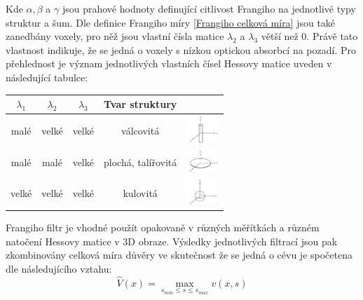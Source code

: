 \documentclass{thesis}%
\begin{document}
Kde $\alpha,\beta$ a $\gamma$ jsou prahové hodnoty definující citlivost Frangiho na jednotlivé typy struktur a šum. Dle definice Frangiho míry  \ref{Frangiho celková míra} jsou také zanedbány voxely, pro něž jsou vlastní čísla matice $\lambda_2$ a $\lambda_3$ větší než 0. Právě tato vlastnost indikuje, že se jedná o voxely s nízkou optickou absorbcí na pozadí. Pro přehlednost je význam jednotlivých vlastních čísel Hessovy matice uveden v následující tabulce:
\begin{center} 
\begin{tabular}{c c c c c}
\hline
$\lambda_1$ & $\lambda_2$  & $\lambda_3$ & Tvar struktury& \\
\hline
malé & velké  & velké & válcovitá &\includegraphics[width=1.2cm]{imgs/tube.png} \\
\hline
malé & malé  & velké & plochá, talířovitá &\includegraphics[width=1.2cm]{imgs/plate.png} \\
\hline
velké & velké  & velké & kulovitá &\includegraphics[width=1.2cm]{imgs/blob.png} \\
\end{tabular}
\end{center}
Frangiho filtr je vhodné použít opakovaně v různých měřítkách a různém natočení Hessovy matice v 3D obraze. Výsledky jednotlivých filtrací jsou pak zkombinovány celková míra důvěry ve skutečnost že se jedná o cévu je spočetena dle následujícího vztahu:
 \begin{equation}
\hat{V}(x) = \max_{s_{min}\leq s\leq s_{max}} v(x,s)
\end{equation}
\end{document}
